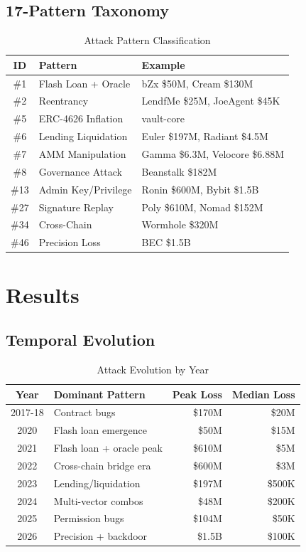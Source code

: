 \documentclass[11pt,a4paper]{article}
\begin{document}
\subsection{17-Pattern Taxonomy}
\begin{table}[h]
\centering
\caption{Attack Pattern Classification}
\begin{tabular}{cll}
\toprule
ID & Pattern & Example \\
\midrule
\#1 & Flash Loan + Oracle & bZx \$50M, Cream \$130M \\
\#2 & Reentrancy & LendfMe \$25M, JoeAgent \$45K \\
\#5 & ERC-4626 Inflation & vault-core \\
\#6 & Lending Liquidation & Euler \$197M, Radiant \$4.5M \\
\#7 & AMM Manipulation & Gamma \$6.3M, Velocore \$6.88M \\
\#8 & Governance Attack & Beanstalk \$182M \\
\#13 & Admin Key/Privilege & Ronin \$600M, Bybit \$1.5B \\
\#27 & Signature Replay & Poly \$610M, Nomad \$152M \\
\#34 & Cross-Chain & Wormhole \$320M \\
\#46 & Precision Loss & BEC \$1.5B \\
\bottomrule
\end{tabular}
\end{table}

\section{Results}

\subsection{Temporal Evolution}

\begin{table}[h]
\centering
\caption{Attack Evolution by Year}
\begin{tabular}{clrr}
\toprule
Year & Dominant Pattern & Peak Loss & Median Loss \\
\midrule
2017-18 & Contract bugs & \$170M & \$20M \\
2020 & Flash loan emergence & \$50M & \$15M \\
2021 & Flash loan + oracle peak & \$610M & \$5M \\
2022 & Cross-chain bridge era & \$600M & \$3M \\
2023 & Lending/liquidation & \$197M & \$500K \\
2024 & Multi-vector combos & \$48M & \$200K \\
2025 & Permission bugs & \$104M & \$50K \\
2026 & Precision + backdoor & \$1.5B & \$100K \\
\bottomrule
\end{tabular}
\end{table}
\end{document}
